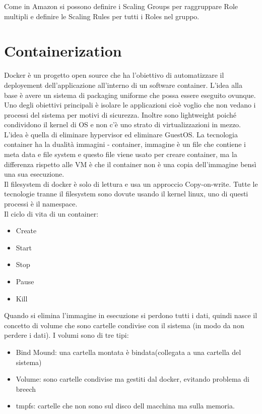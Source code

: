 \documentclass[11pt, twocolumn]{article}
\newenvironment{myitemize}
{ \begin{itemize}[topsep=0ex]
		\setlength{\itemsep}{0pt}
		\setlength{\parskip}{0pt}
		\setlength{\parsep}{0pt}     }
	{ \end{itemize}                  }
\begin{document}
Come in Amazon si possono definire i Scaling Groups per raggruppare Role multipli e definire le Scaling Rules per tutti i Roles nel gruppo.
\section{Containerization}
Docker è un progetto open source che ha l'obiettivo di automatizzare il deployement dell'applicazione all'interno di un software container. L'idea alla base è avere un sistema di packaging uniforme che possa essere eseguito ovunque. Uno degli obiettivi principali è isolare le applicazioni cioè voglio che non vedano i processi del sistema per motivi di sicurezza. Inoltre sono lightweight poiché condividono il kernel di OS e non c'è uno strato di virtualizzazioni in mezzo.\\
L'idea è quella di eliminare hypervisor ed eliminare GuestOS. La tecnologia container ha la dualità immagini - container, immagine è un file che contiene i meta data e file system e questo file viene usato per creare container, ma la differenza rispetto alle VM è che il container non è una copia dell'immagine bensì una sua esecuzione.\\
Il filesystem di docker è solo di lettura e usa un approccio Copy-on-write. Tutte le tecnologie tranne il filesystem sono dovute usando il kernel linux, uno di questi processi è il namespace.\\
Il ciclo di vita di un container:
\begin{myitemize}
	\item Create
	\item Start
	\item Stop
	\item Pause
	\item Kill
\end{myitemize}
Quando si elimina l'immagine in esecuzione si perdono tutti i dati, quindi nasce il concetto di volume che sono cartelle condivise con il sistema (in modo da non perdere i dati).
I volumi sono di tre tipi:
\begin{myitemize}
	\item Bind Mound: una cartella montata è bindata(collegata a una cartella del sistema)
	\item Volume: sono cartelle condivise ma gestiti dal docker, evitando problema di breech
	\item tmpfs: cartelle che non sono sul disco dell macchina ma sulla memoria.
\end{myitemize}
\end{document}
